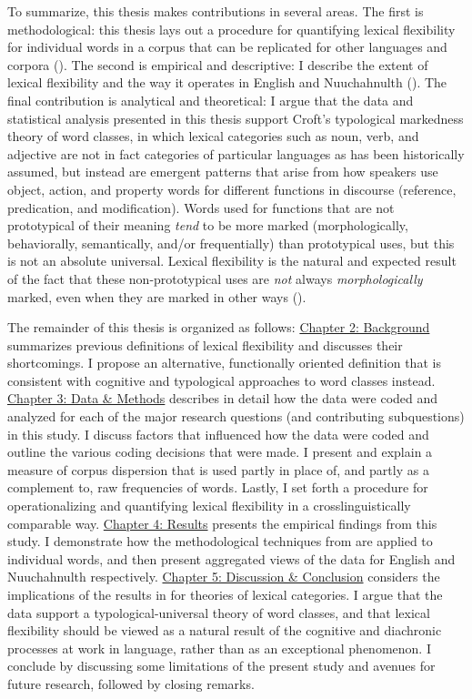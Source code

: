 To summarize, this thesis makes contributions in several areas. The first is methodological: this thesis lays out a procedure for quantifying lexical flexibility for individual words in a corpus that can be replicated for other languages and corpora (). The second is empirical and descriptive: I describe the extent of lexical flexibility and the way it operates in English and Nuuchahnulth (). The final contribution is analytical and theoretical: I argue that the data and statistical analysis presented in this thesis support Croft's typological markedness theory of word classes, in which lexical categories such as noun, verb, and adjective are not in fact categories of particular languages as has been historically assumed, but instead are emergent patterns that arise from how speakers use object, action, and property words for different functions in discourse (reference, predication, and modification). Words used for functions that are not prototypical of their meaning \emph{tend} to be more marked (morphologically, behaviorally, semantically, and/or frequentially) than prototypical uses, but this is not an absolute universal. Lexical flexibility is the natural and expected result of the fact that these non-prototypical uses are \emph{not} always \emph{morphologically} marked, even when they are marked in other ways ().

The remainder of this thesis is organized as follows: \hyperref[ch:background]{Chapter 2: Background} summarizes previous definitions of lexical flexibility and discusses their shortcomings. I propose an alternative, functionally oriented definition that is consistent with cognitive and typological approaches to word classes instead. \hyperref[ch:background]{Chapter 3: Data \& Methods} describes in detail how the data were coded and analyzed for each of the major research questions (and contributing subquestions) in this study. I discuss factors that influenced how the data were coded and outline the various coding decisions that were made. I present and explain a measure of corpus dispersion that is used partly in place of, and partly as a complement to, raw frequencies of words. Lastly, I set forth a procedure for operationalizing and quantifying lexical flexibility in a crosslinguistically comparable way. \hyperref[ch:background]{Chapter 4: Results} presents the empirical findings from this study. I demonstrate how the methodological techniques from  are applied to individual words, and then present aggregated views of the data for English and Nuuchahnulth respectively. \hyperref[ch:background]{Chapter 5: Discussion \& Conclusion} considers the implications of the results in  for theories of lexical categories. I argue that the data support a typological-universal theory of word classes, and that lexical flexibility should be viewed as a natural result of the cognitive and diachronic processes at work in language, rather than as an exceptional phenomenon. I conclude by discussing some limitations of the present study and avenues for future research, followed by closing remarks.

